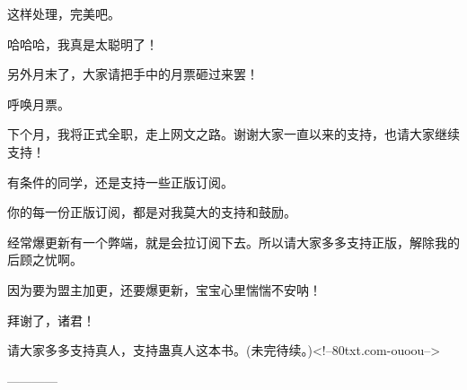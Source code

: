 \begin{this_body}
这样处理，完美吧。

哈哈哈，我真是太聪明了！

另外月末了，大家请把手中的月票砸过来罢！

呼唤月票。

下个月，我将正式全职，走上网文之路。谢谢大家一直以来的支持，也请大家继续支持！

有条件的同学，还是支持一些正版订阅。

你的每一份正版订阅，都是对我莫大的支持和鼓励。

经常爆更新有一个弊端，就是会拉订阅下去。所以请大家多多支持正版，解除我的后顾之忧啊。

因为要为盟主加更，还要爆更新，宝宝心里惴惴不安呐！

拜谢了，诸君！

请大家多多支持真人，支持蛊真人这本书。(未完待续。)<!--80txt.com-ouoou-->

------------

\end{this_body}

